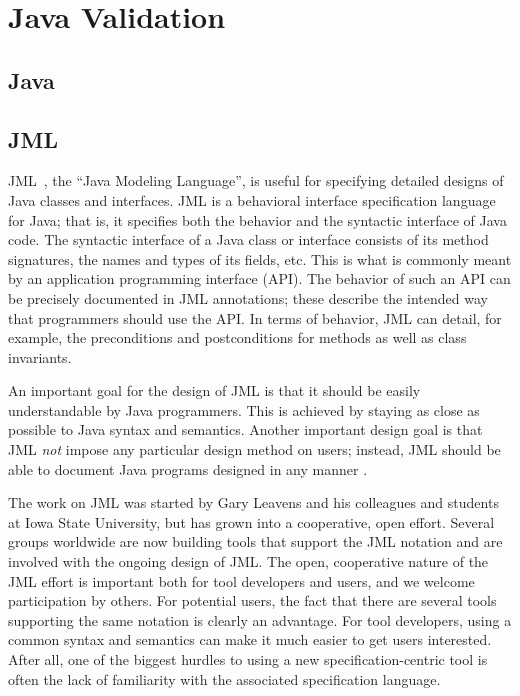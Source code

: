 \chapter{Java Validation}
\section{Java}
\section{JML}
JML~\cite{Leavens-Baker-Ruby99b,Leavens-Baker-Ruby03}, the
``Java Modeling Language'', is useful for specifying detailed
designs of Java classes and interfaces.  JML is a behavioral interface
specification language for Java; that is, it specifies both the behavior
and the syntactic interface of Java code.  The syntactic interface of
a Java class or interface consists of its method signatures,
the names and types of its fields, etc.
This is what is commonly meant by an application programming
interface (API).
The behavior of such an API can be precisely documented in JML annotations;
these describe the intended way that programmers should
use the API.  In terms of behavior, JML can detail, for example, the
preconditions and postconditions for methods as well as class
invariants.

An important goal for the design of JML is that it should be easily
understandable by Java programmers. This is achieved by staying as
close as possible to Java syntax and semantics.  Another important
design goal is that JML {\em not} impose any particular design method
on users; instead, JML should be able to document Java programs
designed in any manner \cite{Leavens-Baker-Ruby03}.

The work on JML was started by Gary Leavens and his colleagues and
students at Iowa State University, but has grown into a cooperative,
open effort.  Several groups worldwide are now building tools that
support the JML notation and are involved with the ongoing design of
JML\@.  The open, cooperative nature of the JML effort is important
both for tool developers and users, and we welcome participation by
others.  For potential users, the fact that there are several tools
supporting the same notation is clearly an advantage.  For tool
developers, using a common syntax and semantics can make it much
easier to get users interested. After all, one of the biggest hurdles
to using a new specification-centric tool is often the lack of
familiarity with the associated specification language.

